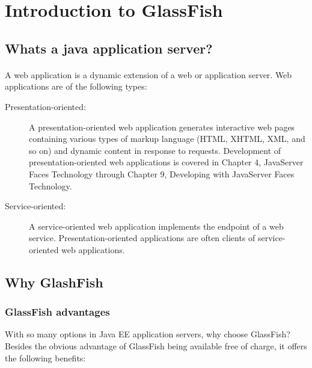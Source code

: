 
\section{Introduction to GlassFish}
\subsection{Whats a java application server?}
\paragraph{}
A web application is a dynamic extension of a web or application server. Web applications are of the following types:

\begin{description}
\item[Presentation-oriented:] A presentation-oriented web application generates interactive web pages containing various types of markup language (HTML, XHTML, XML, and so on) and dynamic content in response to requests. Development of presentation-oriented web applications is covered in Chapter 4, JavaServer Faces Technology through Chapter 9, Developing with JavaServer Faces Technology.

\item[Service-oriented:] A service-oriented web application implements the endpoint of a web service. Presentation-oriented applications are often clients of service-oriented web applications. 
\end{description}

\subsection{Why GlashFish}
\subsubsection{GlassFish advantages}
With so many options in Java EE application servers, why choose GlassFish? Besides the obvious advantage of GlassFish being available free of charge, it offers the following benefits:

